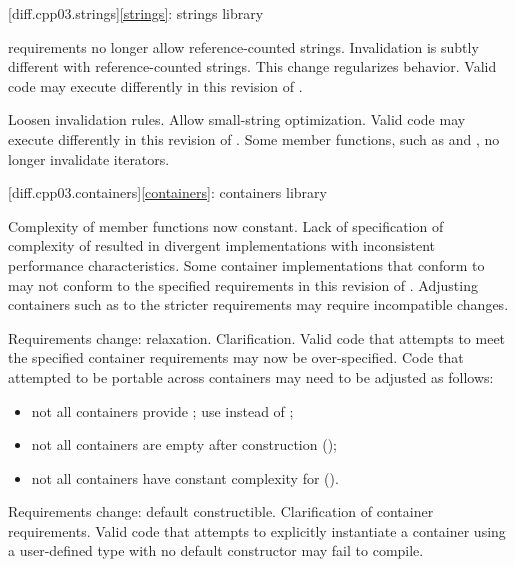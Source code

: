 [diff.cpp03.strings]{\ref*{strings}: strings library}

\change
{} requirements no longer allow reference-counted
strings.
\rationale
Invalidation is subtly different with reference-counted strings.
This change regularizes behavior.
\effect
Valid \CppIII{} code may execute differently in this revision of \Cpp{}.

\change
Loosen  invalidation rules.
\rationale
Allow small-string optimization.
\effect
Valid \CppIII{} code may execute differently in this revision of \Cpp{}.
Some  member functions, such as  and ,
no longer invalidate iterators.

[diff.cpp03.containers]{\ref*{containers}: containers library}

\change
Complexity of  member functions now constant.
\rationale
Lack of specification of complexity of  resulted in
divergent implementations with inconsistent performance characteristics.
\effect
Some container implementations that conform to \CppIII{} may not conform to the
specified  requirements in this revision of \Cpp{}. Adjusting
containers such as  to the stricter requirements may require
incompatible changes.

\change
Requirements change: relaxation.
\rationale
Clarification.
\effect
Valid \CppIII{} code that attempts to meet the specified container requirements
may now be over-specified. Code that attempted to be portable across containers
may need to be adjusted as follows:
\begin{itemize}
\item not all containers provide ; use  instead
of ;
\item not all containers are empty after construction ();
\item not all containers have constant complexity for  ().
\end{itemize}

\change
Requirements change: default constructible.
\rationale
Clarification of container requirements.
\effect
Valid \CppIII{} code that attempts to explicitly instantiate a container using
a user-defined type with no default constructor may fail to compile.

